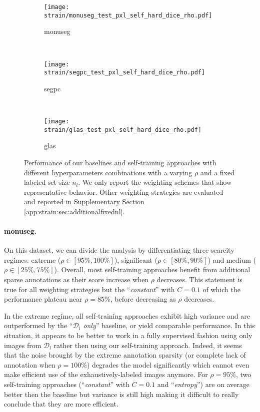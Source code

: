 \begin{figure}[th]
  \centering
    \begin{subfigure}{\textwidth}
    \centering
    \texttt{[image: strain/monuseg\_test\_pxl\_self\_hard\_dice\_rho.pdf]}
    \caption{\acrshort{monuseg}}
      \label{fig:strain:rho_exp_monuseg}
  \end{subfigure} \\
  \begin{subfigure}{\textwidth}
    \centering
    \texttt{[image: strain/segpc\_test\_pxl\_self\_hard\_dice\_rho.pdf]}
    \caption{\acrshort{segpc}}
    \label{fig:strain:rho_exp_segpc}
  \end{subfigure} \\
  \begin{subfigure}{\textwidth}
    \centering
    \texttt{[image: strain/glas\_test\_pxl\_self\_hard\_dice\_rho.pdf]}
    \caption{\acrshort{glas}}
    \label{fig:strain:rho_exp_glas}
  \end{subfigure}
  \caption{Performance of our baselines and self-training approaches with different hyperparameters combinations with a varying $\rho$ and a fixed labeled set size $n_l$. We only report the weighting schemes that show representative behavior. Other weighting strategies are evaluated and reported in Supplementary Section \ref{app:strain:sec:additionalfixednl}.}
  \label{fig:strain:rho_exp}
\end{figure}

\paragraph{\acrshort{monuseg}.} On this dataset, we can divide the analysis by differentiating three scarcity regimes: extreme ($\rho \in [95\%, 100\%]$), significant ($\rho \in [80\%, 90\%]$) and medium ($\rho \in [25\%, 75\%]$). Overall, most self-training approaches benefit from additional sparse annotations as their score increase when $\rho$ decreases. This statement is true for all weighting strategies but the ``\textit{constant}'' with $C = 0.1$ of which the performance plateau near $\rho = 85\%$, before decreasing as $\rho$ decreases. 

In the extreme regime, all self-training approaches exhibit high variance and are outperformed by the ``\textit{$\mathcal{D}_l$ only}'' baseline, or yield comparable performance. In this situation, it appears to be better to work in a fully supervised fashion using only images from $\mathcal{D}_l$ rather then using our self-training approach. Indeed, it seems that the noise brought by the extreme annotation sparsity (or complete lack of annotation when $\rho = 100\%$) degrades the model significantly which cannot even make efficient use of the exhaustively-labeled images anymore. For $\rho = 95\%$, two self-training approaches (``\textit{constant}'' with $C = 0.1$ and ``\textit{entropy}'') are on average better then the baseline but variance is still high making it difficult to really conclude that they are more efficient. 

